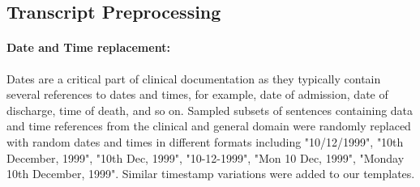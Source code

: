 \documentclass[11pt,a4paper]{article}
\begin{document}

  


\subsection{Transcript Preprocessing}\label{appendix:transcripts}

  \paragraph{Date and Time replacement:}  Dates are a critical part of clinical documentation as they typically contain several references to dates and times, for example, date of admission, date of discharge, time of death, and so on. Sampled subsets of sentences containing data and time references from the clinical and general domain were randomly replaced with random dates and times in different formats including "10/12/1999", "10th December, 1999", "10th Dec, 1999", "10-12-1999", "Mon 10 Dec, 1999", "Monday 10th December, 1999". Similar timestamp variations were added to our templates.
\end{document}
